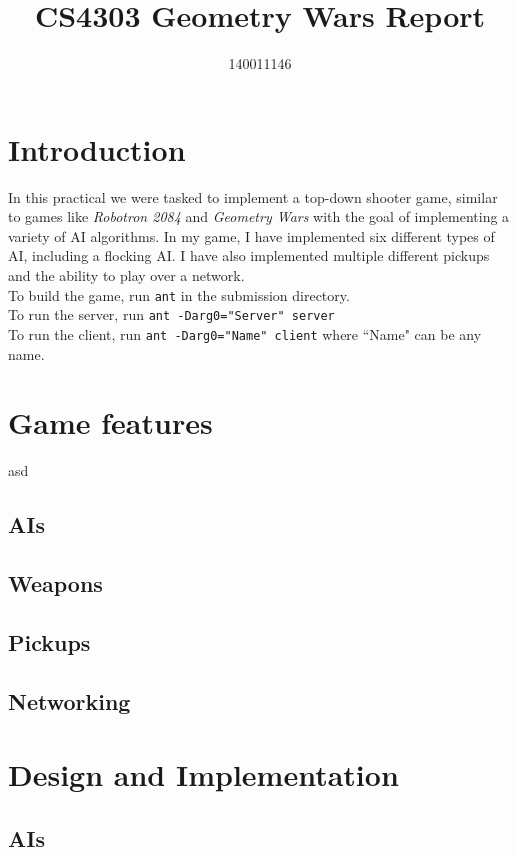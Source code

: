 \documentclass{article}
\title{CS4303 Geometry Wars Report}
\author{140011146}
\newcommand{\n}[0]{\\[\baselineskip]}
\begin{document}
\maketitle

\section{Introduction}
In this practical we were tasked to implement a top-down shooter game, similar to games like \textit{Robotron 2084} and \textit{Geometry Wars} with the goal of implementing a variety of AI algorithms. In my game, I have implemented six different types of AI, including a flocking AI. I have also implemented multiple different pickups and the ability to play over a network.
\n
To build the game, run \texttt{ant} in the submission directory.
\\
\noindent
To run the server, run \texttt{ant -Darg0="Server" server}
\\
\noindent
To run the client, run \texttt{ant -Darg0="Name" client} where ``Name" can be any name.
\section{Game features}
asd
\subsection{AIs}

\subsection{Weapons}

\subsection{Pickups}

\subsection{Networking}

\section{Design and Implementation}

\subsection{AIs}
\end{document}
